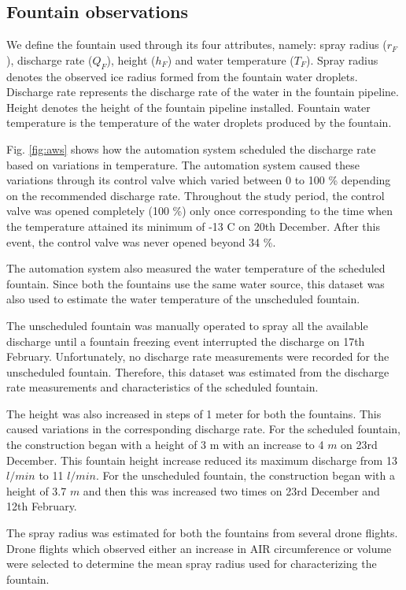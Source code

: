 \documentclass[tc, manuscript]{copernicus}
\begin{document}
\subsection{Fountain observations}

We define the fountain used through its four attributes, namely: spray radius ($r_F$), discharge rate ($Q_F$),
height ($h_F$) and water temperature ($T_F$). Spray radius denotes the observed ice radius formed from the
fountain water droplets. Discharge rate represents the discharge rate of the water in the fountain pipeline.
Height denotes the height of the fountain pipeline installed. Fountain water temperature is the temperature of
the water droplets produced by the fountain.

Fig. \ref{fig:aws} shows how the automation system scheduled the discharge rate based on variations in
temperature. The automation system caused these variations through its control valve which varied between 0 to
100 \% depending on the recommended discharge rate. Throughout the study period, the control valve was opened
completely (100 \%) only once corresponding to the time when the temperature attained its minimum of -13 \degree
C on 20th December. After this event, the control valve was never opened beyond 34 \%.  

The automation system also measured the water temperature of the scheduled fountain. Since both the fountains
use the same water source, this dataset was also used to estimate the water temperature of the unscheduled
fountain.

The unscheduled fountain was manually operated to spray all the available discharge until a fountain freezing
event interrupted the discharge on 17th February. Unfortunately, no discharge rate measurements were recorded
for the unscheduled fountain. Therefore, this dataset was estimated from the discharge rate measurements and
characteristics of the scheduled fountain.

The height was also increased in steps of 1 meter for both the fountains. This caused variations in the
corresponding discharge rate. For the scheduled fountain, the construction began with a height of 3 m with an
increase to 4 $m$ on 23rd December. This fountain height increase reduced its maximum discharge from
13 $l/min$ to 11 $l/min$. For the unscheduled fountain, the construction began with a height of 3.7 $m$ and then
this was increased two times on 23rd December and 12th February.  

The spray radius was estimated for both the fountains from several drone flights. Drone flights which observed
either an increase in AIR circumference or volume were selected to determine the mean spray radius used for
characterizing the fountain.
\end{document}
